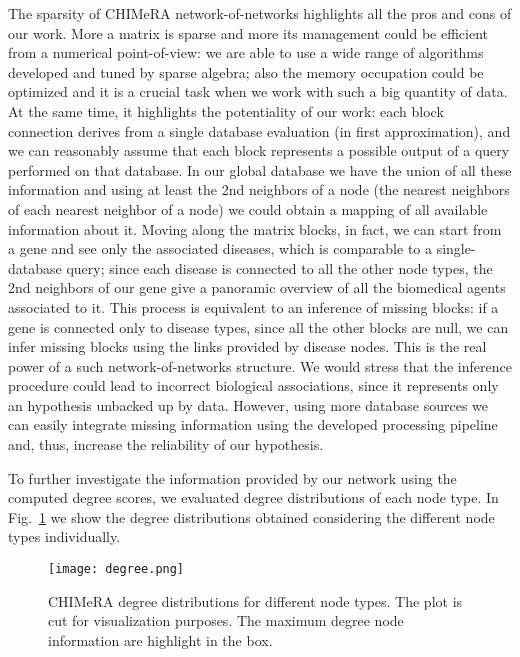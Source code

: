 \documentclass{standalone}
\begin{document}
The sparsity of \textsf{CHIMeRA} network-of-networks highlights all the pros and cons of our work.
More a matrix is sparse and more its management could be efficient from a numerical point-of-view: we are able to use a wide range of algorithms developed and tuned by sparse algebra; also the memory occupation could be optimized and it is a crucial task when we work with such a big quantity of data.
At the same time, it highlights the potentiality of our work: each block connection derives from a single database evaluation (in first approximation), and we can reasonably assume that each block represents a possible output of a query performed on that database.
In our global database we have the union of all these information and using at least the 2nd neighbors of a node (the nearest neighbors of each nearest neighbor of a node) we could obtain a mapping of all available information about it.
Moving along the matrix blocks, in fact, we can start from a gene and see only the associated diseases, which is comparable to a single-database query; since each disease is connected to all the other node types, the 2nd neighbors of our gene give a panoramic overview of all the biomedical agents associated to it.
This process is equivalent to an inference of missing blocks: if a gene is connected only to disease types, since all the other blocks are null, we can infer missing blocks using the links provided by disease nodes.
This is the real power of a such network-of-networks structure.
We would stress that the inference procedure could lead to incorrect biological associations, since it represents only an hypothesis unbacked up by data.
However, using more database sources we can easily integrate missing information using the developed processing pipeline and, thus, increase the reliability of our hypothesis.

To further investigate the information provided by our network using the computed degree scores, we evaluated degree distributions of each node type.
In Fig.~\ref{fig:chimera_degree} we show the degree distributions obtained considering the different node types individually.

\begin{figure}[htbp]
\centering
\texttt{[image: degree.png]}
\caption{\textsf{CHIMeRA} degree distributions for different node types.
The plot is cut for visualization purposes.
The maximum degree node information are highlight in the box.
}
\label{fig:chimera_degree}
\end{figure}
\end{document}
